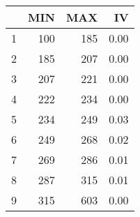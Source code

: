 \begin{table}[ht]
\centering
\begin{tabular}{rrrr}
  \hline
 & MIN & MAX & IV \\ 
  \hline
1 & 100 & 185 & 0.00 \\ 
  2 & 185 & 207 & 0.00 \\ 
  3 & 207 & 221 & 0.00 \\ 
  4 & 222 & 234 & 0.00 \\ 
  5 & 234 & 249 & 0.03 \\ 
  6 & 249 & 268 & 0.02 \\ 
  7 & 269 & 286 & 0.01 \\ 
  8 & 287 & 315 & 0.01 \\ 
  9 & 315 & 603 & 0.00 \\ 
   \hline
\end{tabular}
\end{table}
